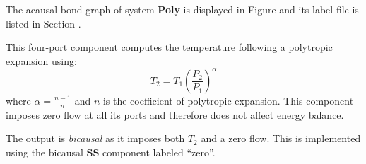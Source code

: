 

   The acausal bond graph of system \textbf{Poly} is
   displayed in Figure  and its label
   file is listed in Section .

This four-port component computes the temperature following a
polytropic expansion using:
\begin{equation}
  T_2 = T_1 \left ( \frac{P_2}{P_1} \right )^\alpha
\end{equation}
where $\alpha = \frac{n-1}{n}$ and $n$ is the coefficient of
polytropic expansion.  This component imposes zero flow at all its
ports and therefore does not affect energy balance.

The output is \emph{bicausal} as it imposes both $T_2$ and a zero flow.
This is implemented using the bicausal \textbf{SS} component labeled
``zero''.

